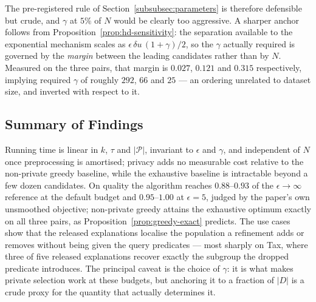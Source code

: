 The pre-registered rule of Section~\ref{subsubsec:parameters} is therefore defensible but crude, and $\gamma$ at $5\%$ of $N$ would be clearly too aggressive.
A sharper anchor follows from Proposition~\ref{prop:hd-sensitivity}: the separation available to the exponential mechanism scales as $\epsilon\,\delta u\,(1+\gamma)/2$, so the $\gamma$ actually required is governed by the \emph{margin} between the leading candidates rather than by $N$.
Measured on the three pairs, that margin is $0.027$, $0.121$ and $0.315$ respectively, implying required $\gamma$ of roughly $292$, $66$ and $25$ --- an ordering unrelated to dataset size, and inverted with respect to it.

\subsection{Summary of Findings}
\label{subsec:experiments-summary}

Running time is linear in $k$, $\tau$ and $|\mathcal{P}|$, invariant to $\epsilon$ and $\gamma$, and independent of $N$ once preprocessing is amortised; privacy adds no measurable cost relative to the non-private greedy baseline, while the exhaustive baseline is intractable beyond a few dozen candidates.
On quality the algorithm reaches $0.88$--$0.93$ of the $\epsilon\rightarrow\infty$ reference at the default budget and $0.95$--$1.00$ at $\epsilon=5$, judged by the paper's own unsmoothed objective; non-private greedy attains the exhaustive optimum exactly on all three pairs, as Proposition~\ref{prop:greedy-exact} predicts.
The use cases show that the released explanations localise the population a refinement adds or removes without being given the query predicates --- most sharply on Tax, where three of five released explanations recover exactly the subgroup the dropped predicate introduces.
The principal caveat is the choice of $\gamma$: it is what makes private selection work at these budgets, but anchoring it to a fraction of $|D|$ is a crude proxy for the quantity that actually determines it.
